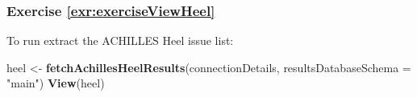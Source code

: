 \documentclass[11pt]{book}
\newenvironment{Shaded}{\begin{snugshade}}{\end{snugshade}}
\newcommand{\DataTypeTok}[1]{\textcolor[rgb]{0.13,0.29,0.53}{#1}}
\newcommand{\KeywordTok}[1]{\textcolor[rgb]{0.13,0.29,0.53}{\textbf{#1}}}
\newcommand{\NormalTok}[1]{#1}
\newcommand{\StringTok}[1]{\textcolor[rgb]{0.31,0.60,0.02}{#1}}
\theoremstyle{definition}
\theoremstyle{definition}
\theoremstyle{definition}
\theoremstyle{remark}
\begin{document}
\hypertarget{exercise-refexrexerciseviewheel}{%
\subsubsection*{Exercise \ref{exr:exerciseViewHeel}}\label{exercise-refexrexerciseviewheel}}

To run extract the ACHILLES Heel issue list:

\begin{Shaded}
\begin{Highlighting}[]
\NormalTok{heel <-}\StringTok{ }\KeywordTok{fetchAchillesHeelResults}\NormalTok{(connectionDetails,}
                                 \DataTypeTok{resultsDatabaseSchema =} \StringTok{"main"}\NormalTok{)}
\KeywordTok{View}\NormalTok{(heel)}
\end{Highlighting}
\end{Shaded}



\backmatter
\printindex
\end{document}
